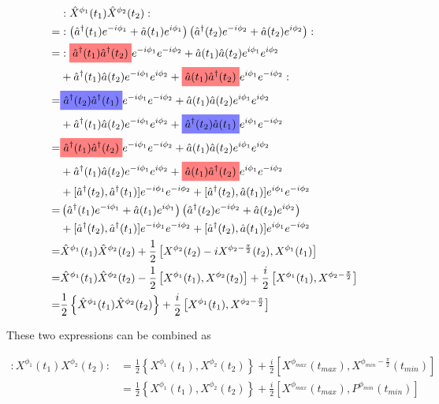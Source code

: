 \documentclass[12pt]{article}
\newcommand{\highlightr}[1]{%
  \colorbox{red!50}{$\displaystyle#1$}}
\newcommand{\highlightb}[1]{%
  \colorbox{blue!50}{$\displaystyle#1$}}
\begin{document}
\begin{align}
&:\hat{X}^{\phi_1}(t_1)\hat{X}^{\phi_2}(t_2):\\
=&:\left(\hat{a}^{\dag}(t_1)e^{-i\phi_1} + \hat{a}(t_1)e^{i \phi_1} \right)\left(\hat{a}^{\dag}(t_2)e^{-i\phi_2} + \hat{a}(t_2)e^{i \phi_2} \right) :\\
=&:\highlightr{\hat{a}^{\dag}(t_1)\hat{a}^{\dag}(t_2)}e^{-i\phi_1}e^{-i\phi_2} + \hat{a}(t_1)\hat{a}(t_2)e^{i\phi_1}e^{i\phi_2}\\
&+ \hat{a}^{\dag}(t_1)\hat{a}(t_2)e^{-i\phi_1}e^{i\phi_2} + \highlightr{\hat{a}(t_1)\hat{a}^{\dag}(t_2)}e^{i\phi_1}e^{-i\phi_2} :\\
=&\highlightb{\hat{a}^{\dag}(t_2)\hat{a}^{\dag}(t_1)}e^{-i\phi_1}e^{-i\phi_2} + \hat{a}(t_1)\hat{a}(t_2)e^{i\phi_1}e^{i\phi_2}\\
&+ \hat{a}^{\dag}(t_1)\hat{a}(t_2)e^{-i\phi_1}e^{i\phi_2} + \highlightb{\hat{a}^{\dag}(t_2)\hat{a}(t_1)}e^{i\phi_1}e^{-i\phi_2} \\
=&\highlightr{\hat{a}^{\dag}(t_1)\hat{a}^{\dag}(t_2)}e^{-i\phi_1}e^{-i\phi_2} + \hat{a}(t_1)\hat{a}(t_2)e^{i\phi_1}e^{i\phi_2}\\
&+ \hat{a}^{\dag}(t_1)\hat{a}(t_2)e^{-i\phi_1}e^{i\phi_2} + \highlightr{\hat{a}(t_1)\hat{a}^{\dag}(t_2)}e^{i\phi_1}e^{-i\phi_2} \\
&+ [\hat{a}^{\dag}(t_2),\hat{a}^{\dag}(t_1)] e^{-i\phi_1}e^{-i\phi_2} + [\hat{a}^{\dag}(t_2),\hat{a}(t_1)]e^{i\phi_1}e^{-i\phi_2}\\
=& \left(\hat{a}^{\dag}(t_1)e^{-i\phi_1} + \hat{a}(t_1)e^{i \phi_1} \right)\left(\hat{a}^{\dag}(t_2)e^{-i\phi_2} + \hat{a}(t_2)e^{i \phi_2} \right)\\
&+ [\hat{a}^{\dag}(t_2),\hat{a}^{\dag}(t_1)] e^{-i\phi_1}e^{-i\phi_2} + [\hat{a}^{\dag}(t_2),\hat{a}(t_1)]e^{i\phi_1}e^{-i\phi_2}\\
=& \hat{X}^{\phi_1}(t_1)\hat{X}^{\phi_2}(t_2) + \frac{1}{2}\left[X^{\phi_2}(t_2)-iX^{\phi_2-\frac{\pi}{2}}(t_2),X^{\phi_1}(t_1)\right]\\
=&  \hat{X}^{\phi_1}(t_1)\hat{X}^{\phi_2}(t_2) - \frac{1}{2}\left[X^{\phi_1}(t_1),X^{\phi_2}(t_2)\right] + \frac{i}{2}\left[X^{\phi_1}(t_1),X^{\phi_2-\frac{\pi}{2}}\right]\\
=& \frac{1}{2}\left\{\hat{X}^{\phi_1}(t_1)\hat{X}^{\phi_2}(t_2)\right\} + \frac{i}{2}\left[X^{\phi_1}(t_1),X^{\phi_2-\frac{\pi}{2}}\right]
\end{align}

These two expressions can be combined as

\begin{align}
:X^{\phi_1}(t_1)X^{\phi_2}(t_2): &= \frac{1}{2}\left\{X^{\phi_1}(t_1),X^{\phi_2}(t_2) \right\}  + \frac{i}{2}\left[X^{\phi_{max}}(t_{max}),X^{\phi_{min}-\frac{\pi}{2}}(t_{min}) \right]\\
&= \frac{1}{2}\left\{X^{\phi_1}(t_1),X^{\phi_2}(t_2) \right\}  + \frac{i}{2}\left[X^{\phi_{max}}(t_{max}),P^{\phi_{min}}(t_{min}) \right]
\end{align}
\end{document}
